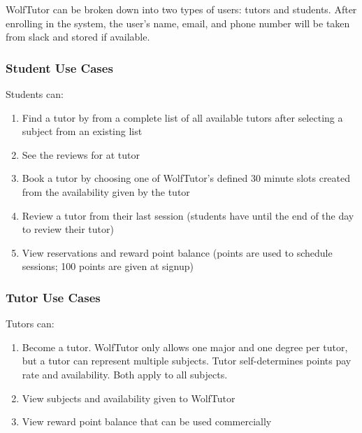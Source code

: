 WolfTutor can be broken down into two types of users: tutors and students.
After enrolling in the system, the user's name, email, and phone number will be taken from slack and stored if available.

\subsubsection{Student Use Cases}
\label{sec:student-use-cases}

Students can:
\begin{enumerate}
  \item Find a tutor by from a complete list of all available tutors after selecting a subject from an existing list
  \item See the reviews for at tutor
  \item Book a tutor by choosing one of WolfTutor's defined 30 minute slots created from the availability given by the tutor
  \item Review a tutor from their last session (students have until the end of the day to review their tutor)
  \item View reservations and reward point balance (points are used to schedule sessions; 100 points are given at signup)
\end{enumerate}

\subsubsection{Tutor Use Cases}
\label{sec:tutor-use-cases}

Tutors can:
\begin{enumerate}
  \item Become a tutor. WolfTutor only allows one major and one degree per tutor, but a tutor can represent multiple subjects. Tutor self-determines points pay rate and availability. Both apply to all subjects.
  \item View subjects and availability given to WolfTutor
  \item View reward point balance that can be used commercially
\end{enumerate}
